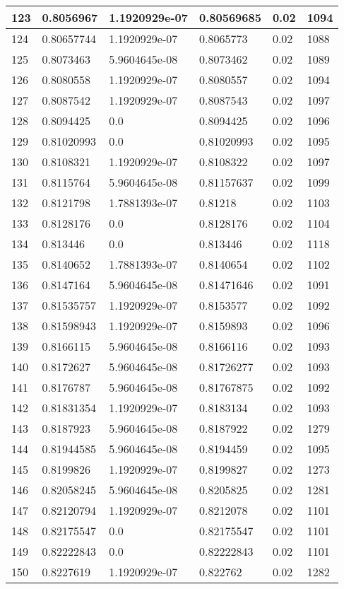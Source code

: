 \begin{longtable}{|l|l|l|l|l|l|}
123 & 0.8056967 & 1.1920929e-07 & 0.80569685 & 0.02 & 1094 \\ \hline 
124 & 0.80657744 & 1.1920929e-07 & 0.8065773 & 0.02 & 1088 \\ \hline 
125 & 0.8073463 & 5.9604645e-08 & 0.8073462 & 0.02 & 1089 \\ \hline 
126 & 0.8080558 & 1.1920929e-07 & 0.8080557 & 0.02 & 1094 \\ \hline 
127 & 0.8087542 & 1.1920929e-07 & 0.8087543 & 0.02 & 1097 \\ \hline 
128 & 0.8094425 & 0.0 & 0.8094425 & 0.02 & 1096 \\ \hline 
129 & 0.81020993 & 0.0 & 0.81020993 & 0.02 & 1095 \\ \hline 
130 & 0.8108321 & 1.1920929e-07 & 0.8108322 & 0.02 & 1097 \\ \hline 
131 & 0.8115764 & 5.9604645e-08 & 0.81157637 & 0.02 & 1099 \\ \hline 
132 & 0.8121798 & 1.7881393e-07 & 0.81218 & 0.02 & 1103 \\ \hline 
133 & 0.8128176 & 0.0 & 0.8128176 & 0.02 & 1104 \\ \hline 
134 & 0.813446 & 0.0 & 0.813446 & 0.02 & 1118 \\ \hline 
135 & 0.8140652 & 1.7881393e-07 & 0.8140654 & 0.02 & 1102 \\ \hline 
136 & 0.8147164 & 5.9604645e-08 & 0.81471646 & 0.02 & 1091 \\ \hline 
137 & 0.81535757 & 1.1920929e-07 & 0.8153577 & 0.02 & 1092 \\ \hline 
138 & 0.81598943 & 1.1920929e-07 & 0.8159893 & 0.02 & 1096 \\ \hline 
139 & 0.8166115 & 5.9604645e-08 & 0.8166116 & 0.02 & 1093 \\ \hline 
140 & 0.8172627 & 5.9604645e-08 & 0.81726277 & 0.02 & 1093 \\ \hline 
141 & 0.8176787 & 5.9604645e-08 & 0.81767875 & 0.02 & 1092 \\ \hline 
142 & 0.81831354 & 1.1920929e-07 & 0.8183134 & 0.02 & 1093 \\ \hline 
143 & 0.8187923 & 5.9604645e-08 & 0.8187922 & 0.02 & 1279 \\ \hline 
144 & 0.81944585 & 5.9604645e-08 & 0.8194459 & 0.02 & 1095 \\ \hline 
145 & 0.8199826 & 1.1920929e-07 & 0.8199827 & 0.02 & 1273 \\ \hline 
146 & 0.82058245 & 5.9604645e-08 & 0.8205825 & 0.02 & 1281 \\ \hline 
147 & 0.82120794 & 1.1920929e-07 & 0.8212078 & 0.02 & 1101 \\ \hline 
148 & 0.82175547 & 0.0 & 0.82175547 & 0.02 & 1101 \\ \hline 
149 & 0.82222843 & 0.0 & 0.82222843 & 0.02 & 1101 \\ \hline 
150 & 0.8227619 & 1.1920929e-07 & 0.822762 & 0.02 & 1282 \\ \hline 
\end{longtable}